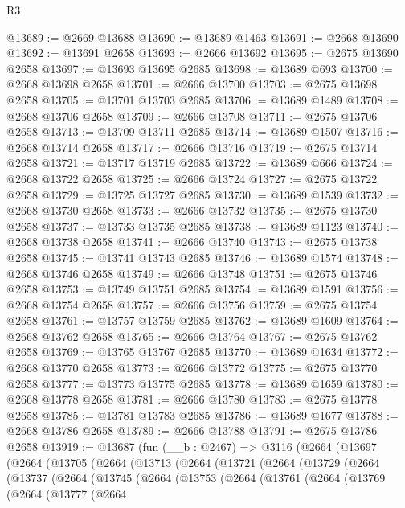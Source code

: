 \begin{lexlean}{R3}
\begin{coremodule}
@13689 := @2669 @13688
@13690 := @13689 @1463
@13691 := @2668 @13690
@13692 := @13691 @2658
@13693 := @2666 @13692
@13695 := @2675 @13690 @2658
@13697 := @13693 @13695 @2685
@13698 := @13689 @693
@13700 := @2668 @13698 @2658
@13701 := @2666 @13700
@13703 := @2675 @13698 @2658
@13705 := @13701 @13703 @2685
@13706 := @13689 @1489
@13708 := @2668 @13706 @2658
@13709 := @2666 @13708
@13711 := @2675 @13706 @2658
@13713 := @13709 @13711 @2685
@13714 := @13689 @1507
@13716 := @2668 @13714 @2658
@13717 := @2666 @13716
@13719 := @2675 @13714 @2658
@13721 := @13717 @13719 @2685
@13722 := @13689 @666
@13724 := @2668 @13722 @2658
@13725 := @2666 @13724
@13727 := @2675 @13722 @2658
@13729 := @13725 @13727 @2685
@13730 := @13689 @1539
@13732 := @2668 @13730 @2658
@13733 := @2666 @13732
@13735 := @2675 @13730 @2658
@13737 := @13733 @13735 @2685
@13738 := @13689 @1123
@13740 := @2668 @13738 @2658
@13741 := @2666 @13740
@13743 := @2675 @13738 @2658
@13745 := @13741 @13743 @2685
@13746 := @13689 @1574
@13748 := @2668 @13746 @2658
@13749 := @2666 @13748
@13751 := @2675 @13746 @2658
@13753 := @13749 @13751 @2685
@13754 := @13689 @1591
@13756 := @2668 @13754 @2658
@13757 := @2666 @13756
@13759 := @2675 @13754 @2658
@13761 := @13757 @13759 @2685
@13762 := @13689 @1609
@13764 := @2668 @13762 @2658
@13765 := @2666 @13764
@13767 := @2675 @13762 @2658
@13769 := @13765 @13767 @2685
@13770 := @13689 @1634
@13772 := @2668 @13770 @2658
@13773 := @2666 @13772
@13775 := @2675 @13770 @2658
@13777 := @13773 @13775 @2685
@13778 := @13689 @1659
@13780 := @2668 @13778 @2658
@13781 := @2666 @13780
@13783 := @2675 @13778 @2658
@13785 := @13781 @13783 @2685
@13786 := @13689 @1677
@13788 := @2668 @13786 @2658
@13789 := @2666 @13788
@13791 := @2675 @13786 @2658
@13919 := @13687
    (fun (__b : @2467) =>
    @3116
      (@2664
        (@13697
          (@2664
            (@13705
              (@2664
                (@13713
                  (@2664
                    (@13721
                      (@2664
                        (@13729
                          (@2664
                            (@13737
                              (@2664
                                (@13745
                                  (@2664
                                    (@13753
                                      (@2664
                                        (@13761
                                          (@2664
                                            (@13769
                                              (@2664
                                                (@13777
                                                  (@2664

\end{coremodule}
\end{lexlean}
